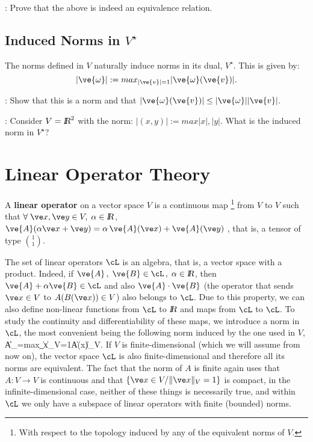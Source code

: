 \ejer: Prove that the above is indeed an equivalence relation.


\subsection{Induced Norms in $V^{\star}$}


The norms defined in $V$ naturally induce norms in its dual, $V^{\star}$. This is given by: \begin{equation} \label{eq:norma_inducida_en_dual} |\ve{\omega}| := max_{|\ve{v}|=1}{|\ve{\omega}(\ve{v})|}. \end{equation} \espa

\ejer: Show that this is a norm and that $|\ve{\omega}(\ve{v})| \leq |\ve{\omega}||\ve{v}|$.

\ejer: Consider $V=\mbox{\sl {l$\!\!\!\;\:\!$R}}^2$ with the norm: $|(x,y)|:= max{|x|,|y|}$. What is the induced norm in $V^{\star}$?



\section{Linear Operator Theory}
\label{Teoria_de_Operadores_Lineales}


A {\bf linear operator}  
 on a vector space $V$ is a continuous map \footnote{With respect to the topology induced by any of the equivalent norms of $V$.}
from $V$ to $V$ such that $\forall \; \ve x,\ve y \in V,\; \alpha \in \re$, 
$\ve{A}(\alpha \ve x+ \ve y)=\alpha\,\ve{A}(\ve x) + \ve{A}(\ve y)\;$,
that is, a tensor of type ${1 \choose 1}$.

The set of linear operators
$\cL$ is an algebra, that is, a vector space with a product.
Indeed, if $\ve{A}\,,\;\ve{B}\in \cL\,,\;\alpha\in \re$, 
then $\ve{A}+\alpha\ve{B}\in\cL$ and also 
$\ve{A}\cdot\ve{B}$ (the operator that sends $\ve x\in V$ 
to $A(B(\ve x)) \in V$) also belongs to $\cL$.
Due to this property, we can also define non-linear functions from $\cL$ to $\mbox{\sl {l$\!\!\!\;\:\!$R}}$ and maps from $\cL$ to $\cL$. To study the continuity and differentiability of these maps, we introduce a norm in $\cL$, the most convenient being the following norm induced by the one used in $V$,
\beq
\|A\|_{\cL}=\mbox{max}_{\|\ve x\|_V=1}\|A(\ve x)\|_V.
\eeq
If $V$ is finite-dimensional (which we will assume from now on), 
the vector space $\cL$ is also finite-dimensional and therefore all its norms are equivalent. The fact that the norm of $A$ is finite again uses that 
$A:V\to V$ is continuous and that $\{\ve x\in V/\|\ve x\|_V=1\}$ is compact,
in the infinite-dimensional case, neither of these things is necessarily true, and within $\cL$ we only have a subspace of linear operators with finite (bounded) norms.
\espa

